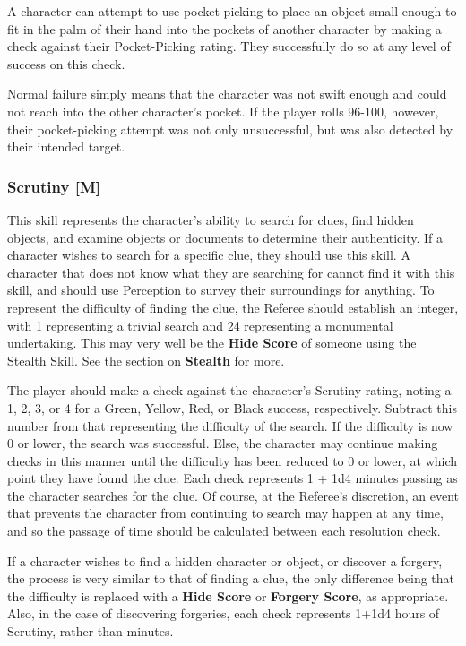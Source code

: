 \documentclass[oneside]{book}
\begin{document}
\begin{multicols}{2}
A character can attempt to use pocket-picking to place an object small enough to fit in the palm of their hand into the pockets of another character by making a check against their Pocket-Picking rating. They successfully do so at any level of success on this check.

Normal failure simply means that the character was not swift enough and could not reach into the other character's pocket. If the player rolls 96-100, however, their pocket-picking attempt was not only unsuccessful, but was also detected by their intended target.

\subsubsection{Scrutiny [M]}
This skill represents the character's ability to search for clues, find hidden objects, and examine objects or documents to determine their authenticity. If a character wishes to search for a specific clue, they should use this skill.  A character that does not know what they are searching for cannot find it with this skill, and should use Perception to survey their surroundings for anything. To represent the difficulty of finding the clue, the Referee should establish an integer, with 1 representing a trivial search and 24 representing a monumental undertaking. This may very well be the \textbf{Hide Score} of someone using the Stealth Skill. See the section on \textbf{Stealth} for more.

 The player should make a check against the character's Scrutiny rating, noting a 1, 2, 3, or 4 for a Green, Yellow, Red, or Black success, respectively. Subtract this number from that representing the difficulty of the search. If the difficulty is now 0 or lower, the search was successful. Else, the character may continue making checks in this manner until the difficulty has been reduced to 0 or lower, at which point they have found the clue. Each check represents 1 + 1d4 minutes passing as the character searches for the clue. Of course, at the Referee's discretion, an event that prevents the character from continuing to search may happen at any time, and so the passage of time should be calculated between each resolution check. 

If a character wishes to find a hidden character or object, or discover a forgery, the process is very similar to that of finding a clue, the only difference being that the difficulty is replaced with a \textbf{Hide Score} or \textbf{Forgery Score}, as appropriate. Also, in the case of discovering forgeries, each check represents 1+1d4 hours of Scrutiny, rather than minutes. 


\end{multicols}
\end{document}
